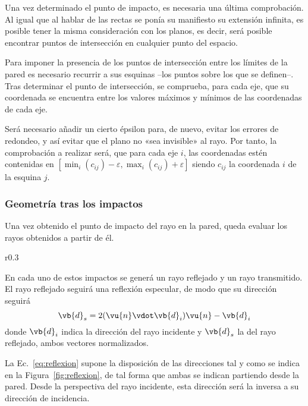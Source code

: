 Una vez determinado el punto de impacto, es necesaria una última comprobación.
Al igual que al hablar de las rectas se ponía su manifiesto su extensión infinita, es posible tener la misma consideración con los planos, es decir, será posible encontrar puntos de intersección en cualquier punto del espacio.

Para imponer la presencia de los puntos de intersección entre los límites de la pared es necesario recurrir a sus esquinas --los puntos sobre los que se definen--.
Tras determinar el punto de intersección, se comprueba, para cada eje, que su coordenada se encuentra entre los valores máximos y mínimos de las coordenadas de cada eje.

Será necesario añadir un cierto épsilon para, de nuevo, evitar los errores de redondeo, y así evitar que el plano no «sea invisible» al rayo.
Por tanto, la comprobación a realizar será, que para cada eje $i$, las coordenadas estén contenidas en $[\min_i(c_{ij})-\varepsilon, \max_i(c_{ij})+\varepsilon]$ siendo $c_{ij}$ la coordenada $i$ de la esquina $j$.

\subsubsection*{Geometría tras los impactos}

Una vez obtenido el punto de impacto del rayo en la pared, queda evaluar los rayos obtenidos a partir de él.

\begin{wrapfigure}{r}{0.3\textwidth}
    \vspace*{-0.75cm}
    \centering
    
    \caption{Reflexión especular.}
    \label{fig:reflexion}
\end{wrapfigure}
En cada uno de estos impactos se generá un rayo reflejado y un rayo transmitido.
El rayo reflejado seguirá una reflexión especular, de modo que su dirección seguirá
\begin{equation}
    \label{eq:reflexion}
    \vb{d}_s = 2(\vu{n} \vdot \vb{d}_i)\vu{n} - \vb{d}_i
\end{equation}
donde $\vb{d}_i$ indica la dirección del rayo incidente y $\vb{d}_s$ la del rayo reflejado, ambos vectores normalizados.

La Ec.~\eqref{eq:reflexion} supone la disposición de las direcciones tal y como se indica en la Figura~\ref{fig:reflexion}, de tal forma que ambas se indican partiendo desde la pared.
Desde la perspectiva del rayo incidente, esta dirección será la inversa a su dirección de incidencia.

